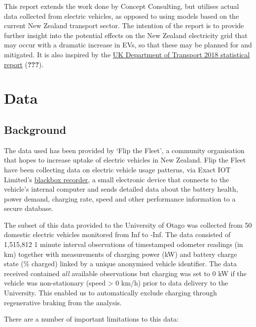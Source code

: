 \documentclass[]{article}
\begin{document}
This report extends the work done by Concept Consulting, but utilises actual data collected from electric vehicles, as opposed to using models based on the current New Zealand transport sector. The intention of the report is to provide further insight into the potential effects on the New Zealand electricity grid that may occur with a dramatic increase in EVs, so that these may be planned for and mitigated. It is also inspired by the \href{https://assets.publishing.service.gov.uk/government/uploads/system/uploads/attachment_data/file/764270/electric-chargepoint-analysis-2017-domestics.pdf}{UK Department of Transport 2018 statistical report} ({\textbf{???}}).

\hypertarget{data}{%
\section{Data}\label{data}}

\hypertarget{background}{%
\subsection{Background}\label{background}}

The data used has been provided by `Flip the Fleet', a community organisation that hopes to increase uptake of electric vehicles in New Zealand. Flip the Fleet have been collecting data on electric vehicle usage patterns, via Exact IOT Limited's \href{https://flipthefleet.org/ev-black-box/}{blackbox recorder}, a small electronic device that connects to the vehicle's internal computer and sends detailed data about the battery health, power demand, charging rate, speed and other performance information to a secure database.

The subset of this data provided to the University of Otago was collected from 50 domestic electric vehicles monitored from Inf to -Inf. The data consisted of 1,515,812 1 minute interval observations of timestamped odometer readings (in km) together with measurements of charging power (kW) and battery charge state (\% charged) linked by a unique anonymised vehicle identifier. The data received contained \emph{all} available observations but charging was set to 0 kW if the vehicle was non-stationary (speed \textgreater{} 0 km/h) prior to data delivery to the University. This enabled us to automatically exclude charging through regenerative braking from the analysis.

There are a number of important limitations to this data:
\end{document}
